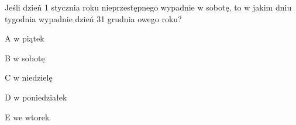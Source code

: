\begin{tresc}
Jeśli dzień 1 stycznia roku nieprzestępnego wypadnie w sobotę, to w jakim dniu tygodnia wypadnie dzień 31 grudnia owego roku?
\end{tresc}
\begin{wariant}{A} w piątek \end{wariant}
\begin{wariant}{B} w sobotę \end{wariant}
\begin{wariant}{C} w niedzielę \end{wariant}
\begin{wariant}{D} w poniedziałek \end{wariant}
\begin{wariant}{E} we wtorek \end{wariant}
